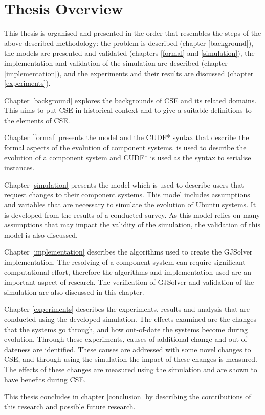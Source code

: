 \section{Thesis Overview}
This thesis is organised and presented in the order that resembles the steps of the above described methodology:
the problem is described (chapter \ref{background}), the models are presented and validated (chapters \ref{formal} and \ref{simulation}),
the implementation and validation of the simulation are described (chapter \ref{implementation}), and the experiments and their results are discussed (chapter \ref{experiments}).  

Chapter \ref{background} explores the backgrounds of CSE and its related domains.
This aims to put CSE in historical context and to give a suitable definitions to the elements of CSE.

Chapter \ref{formal} presents the \modelname model and the CUDF* syntax that describe the formal aspects of the evolution of component systems.
\modelname is used to describe the evolution of a component system and CUDF* is used as the syntax to serialise \modelname instances.

Chapter \ref{simulation} presents the \usermodel model which is used to describe users that request changes to their component systems.
This model includes assumptions and variables that are necessary to simulate the evolution of Ubuntu systems. 
It is developed from the results of a conducted survey.
As this model relies on many assumptions that may impact the validity of the simulation, the validation of this model is also discussed. 

Chapter \ref{implementation} describes the algorithms used to create the GJSolver implementation.
The resolving of a component system can require significant computational effort,
therefore the algorithms and implementation used are an important aspect of research.
The verification of GJSolver and validation of the simulation are also discussed in this chapter.

Chapter \ref{experiments} describes the experiments, results and analysis that are conducted using the developed simulation.
The effects examined are the changes that the systems go through, and how out-of-date the systems become during evolution.
Through these experiments, causes of additional change and out-of-dateness are identified.
These causes are addressed with some novel changes to CSE, and through using the simulation the impact of these changes is measured.
The effects of these changes are measured using the simulation and are shown to have benefits during CSE.

This thesis concludes in chapter \ref{conclusion} by describing the contributions of this research and possible future research.
